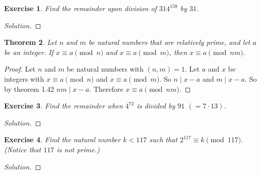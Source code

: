 \documentclass[12pt,leqno]{article}
\numberwithin{equation}{section}
\newtheorem{thm}{Theorem}[section]
\newtheorem{exer}[thm]{Exercise}
\theoremstyle{definition}
\begin{document}
\begin{exer}
Find the remainder upon division of $314^{159}$ by $31$.
\end{exer}
\begin{proof}[Solution]
\end{proof}

\pagebreak
\begin{thm}
Let $n$ and $m$ be natural numbers that are relatively prime, and
let $a$ be an integer.  If $x \equiv a \pmod{n}$ and $x \equiv a
\pmod{m}$, then $x \equiv a \pmod{nm}$.
\end{thm}
\begin{proof}[Proof]
  Let $n$ and $m$ be natural numbers with $(n, m) = 1$.  Let $a$ and $x$ be integers with $x \equiv a \pmod{n}$ and $x \equiv a \pmod{m}$.  So $n \mid x - a$ and $m \mid x - a$.  So by theorem 1.42 $nm \mid x - a$.  Therefore $x \equiv a \pmod{nm}$.
\end{proof}

\begin{exer}
Find the remainder when $4^{72}$ is divided by $91$ $(=7\cdot 13)$.
\end{exer}
\begin{proof}[Solution]
\end{proof}


\begin{exer}
Find the natural number $k < 117$ such that $2^{117} \equiv k
\pmod{117}$. (Notice that $117$ is not prime.)
\end{exer}
\begin{proof}[Solution]
\end{proof}
\end{document}
